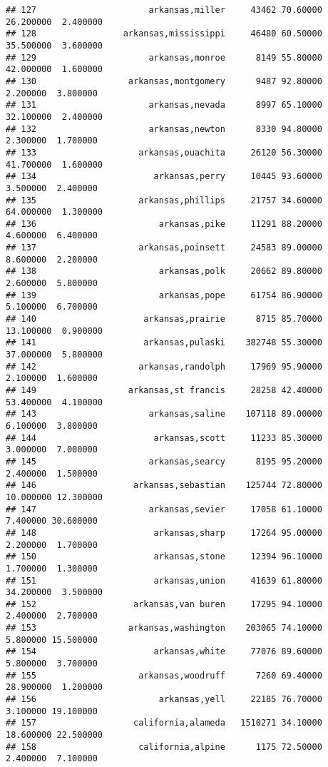 \documentclass[
]{article}
\begin{document}
\begin{verbatim}
## 127                      arkansas,miller     43462 70.60000 26.200000  2.400000
## 128                 arkansas,mississippi     46480 60.50000 35.500000  3.600000
## 129                      arkansas,monroe      8149 55.80000 42.000000  1.600000
## 130                  arkansas,montgomery      9487 92.80000  2.200000  3.800000
## 131                      arkansas,nevada      8997 65.10000 32.100000  2.400000
## 132                      arkansas,newton      8330 94.80000  2.300000  1.700000
## 133                    arkansas,ouachita     26120 56.30000 41.700000  1.600000
## 134                       arkansas,perry     10445 93.60000  3.500000  2.400000
## 135                    arkansas,phillips     21757 34.60000 64.000000  1.300000
## 136                        arkansas,pike     11291 88.20000  4.600000  6.400000
## 137                    arkansas,poinsett     24583 89.00000  8.600000  2.200000
## 138                        arkansas,polk     20662 89.80000  2.600000  5.800000
## 139                        arkansas,pope     61754 86.90000  5.100000  6.700000
## 140                     arkansas,prairie      8715 85.70000 13.100000  0.900000
## 141                     arkansas,pulaski    382748 55.30000 37.000000  5.800000
## 142                    arkansas,randolph     17969 95.90000  2.100000  1.600000
## 149                  arkansas,st francis     28258 42.40000 53.400000  4.100000
## 143                      arkansas,saline    107118 89.00000  6.100000  3.800000
## 144                       arkansas,scott     11233 85.30000  3.000000  7.000000
## 145                      arkansas,searcy      8195 95.20000  2.400000  1.500000
## 146                   arkansas,sebastian    125744 72.80000 10.000000 12.300000
## 147                      arkansas,sevier     17058 61.10000  7.400000 30.600000
## 148                       arkansas,sharp     17264 95.00000  2.200000  1.700000
## 150                       arkansas,stone     12394 96.10000  1.700000  1.300000
## 151                       arkansas,union     41639 61.80000 34.200000  3.500000
## 152                   arkansas,van buren     17295 94.10000  2.400000  2.700000
## 153                  arkansas,washington    203065 74.10000  5.800000 15.500000
## 154                       arkansas,white     77076 89.60000  5.800000  3.700000
## 155                    arkansas,woodruff      7260 69.40000 28.900000  1.200000
## 156                        arkansas,yell     22185 76.70000  3.100000 19.100000
## 157                   california,alameda   1510271 34.10000 18.600000 22.500000
## 158                    california,alpine      1175 72.50000  2.400000  7.100000

\end{verbatim}
\end{document}
